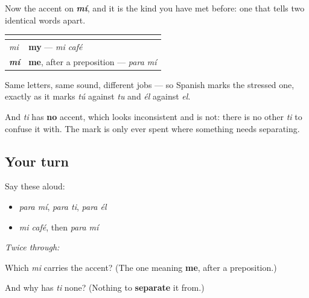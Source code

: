 \begin{culture}
Now the accent on \emph{\textbf{mí}}, and it is the kind you have met before: one that tells two identical words apart.

\noindent
\begin{tabularx}{\linewidth}{@{}>{\raggedright\arraybackslash}X>{\raggedright\arraybackslash}X@{}}
\toprule
\textbf{} & \textbf{} \\
\midrule
\emph{mi} & \textbf{my} — \emph{mi café} \\
\emph{\textbf{mí}} & \textbf{me}, after a preposition — \emph{para mí} \\
\bottomrule
\end{tabularx}

Same letters, same sound, different jobs — so Spanish marks the stressed one, exactly as it marks \emph{tú} against \emph{tu} and \emph{él} against \emph{el}.

And \emph{ti} has \textbf{no} accent, which looks inconsistent and is not: there is no other \emph{ti} to confuse it with. The mark is only ever spent where something needs separating.
\end{culture}

\subsection*{Your turn}
Say these aloud:

\begin{itemize}
\raggedright
  \item \emph{para mí}, \emph{para ti}, \emph{para él}
  \item \emph{mi café}, then \emph{para mí}
\end{itemize}

\emph{Twice through:}

\begin{tcolorbox}[breakable,colback=teal!4,colframe=teal!35!black,title={Before you move on}]
Which \emph{mi} carries the accent? (The one meaning \textbf{me}, after a preposition.)

And why has \emph{ti} none? (Nothing to \textbf{separate} it from.)
\end{tcolorbox}
